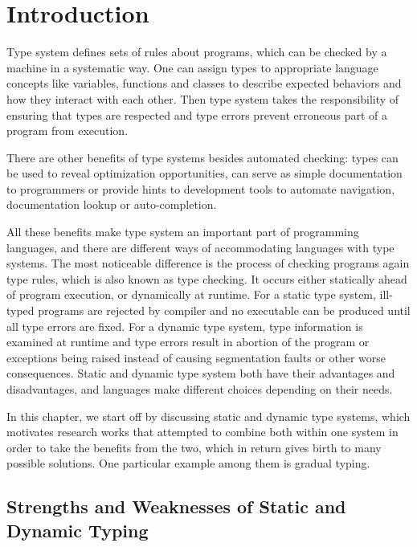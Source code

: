 
\renewcommand{\thechapter}{1}

\chapter{Introduction}


Type system defines sets of rules about programs, which can be checked by a machine
in a systematic way.
One can assign types to appropriate language concepts like
variables, functions and classes to describe expected behaviors
and how they interact with each other.
Then type system takes the responsibility of ensuring that types are respected and
type errors prevent erroneous part of a program from execution.

There are other benefits of type systems besides automated checking:
types can be used to reveal optimization opportunities,
can serve as simple documentation to programmers or
provide hints to development tools to automate navigation, documentation lookup
or auto-completion.

All these benefits make type system an important part of programming languages,
and there are different ways of accommodating languages with type systems.
The most noticeable difference is the process of checking programs again type rules,
which is also known as type checking.
It occurs either statically ahead of program execution, or dynamically at runtime.
For a static type system, ill-typed programs are rejected by compiler and
no executable can be produced until all type errors are fixed.
For a dynamic type system, type information is examined at runtime and type errors result
in abortion of the program or exceptions being raised
instead of causing segmentation faults or other worse consequences.
Static and dynamic type system both have their advantages and disadvantages,
and languages make different choices depending on their needs.

In this chapter, we start off by discussing static and dynamic type systems,
which motivates research works that attempted to combine both within one system
in order to take the benefits from the two,
which in return gives birth to many possible solutions.
One particular example among them is gradual typing.

\section{Strengths and Weaknesses of Static and Dynamic Typing}

